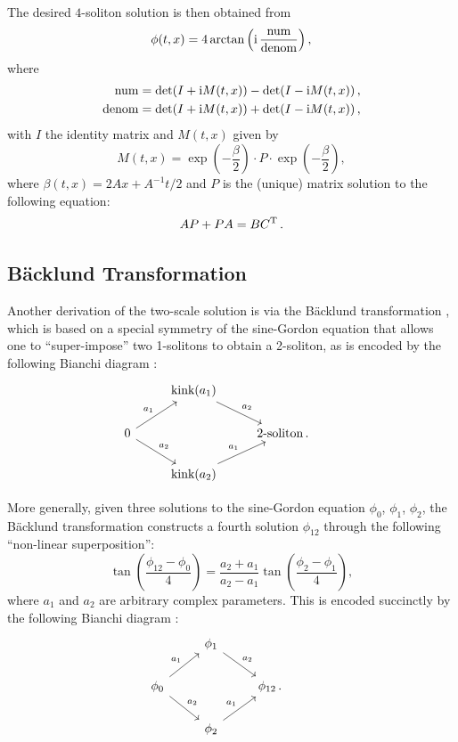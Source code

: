 \documentclass[%
reprint,
superscriptaddress,
amsmath,amssymb,
aps,
prd,
floatfix,
nofootinbib
]{revtex4-1}
\def\ii{{\rm i}}
\begin{document}
The desired $4$-soliton solution is then obtained from
\begin{equation}
  \phi(t,x) = 4\arctan \left(\ii\,\frac{{\rm num}}{{\rm denom}}\right),
\end{equation}
where
\begin{equation}
  \begin{aligned}
    {\rm num} &= \det(I + \ii M(t,x))-\det(I - \ii M(t,x))\,,\\
    {\rm denom} &= \det(I + \ii M(t,x))+\det(I - \ii M(t,x))\,,
  \end{aligned}
\end{equation}
with $I$ the identity matrix and $M(t,x)$ given by
\begin{equation}
  M(t,x) = \exp\left(-\frac{\beta}{2}\right)\cdot P \cdot \exp\left(-\frac{\beta}{2}\right),
\end{equation}
where $\beta(t,x) = 2Ax+A^{-1}t/2$ and $P$ is the (unique) matrix solution to the following equation:
\begin{equation}\label{lyapnov}
  AP + PA = B C^{\rm T}\,.
\end{equation}

\subsection{B\"acklund Transformation}
Another derivation of the two-scale solution is via the B\"acklund transformation \cite{Dodd499, hietarinta1997introduction, Cuenda20111047}, which is based on a special symmetry of the sine-Gordon equation that allows one to ``super-impose'' two 1-solitons to obtain a 2-soliton, as is encoded by the following Bianchi diagram \cite{Cuenda20111047}:
\[
\begin{tikzcd}
  & \text{kink}(a_1) \arrow{dr}{a_2} &&\\
  0\arrow{ur}{a_1}\arrow{dr}{a_2}&&\text{2-soliton\,.}&\\
 &\text{kink}(a_2)\arrow{ur}{a_1}&&
\end{tikzcd}
\]

More generally, given three solutions to the sine-Gordon equation $\phi_0$, $\phi_1$, $\phi_2$, the B\"acklund transformation constructs a fourth solution $\phi_{12}$ through the following ``non-linear superposition'':
\begin{equation}
  \tan \left(\frac{\phi_{12}-\phi_0}{4}\right) = \frac{a_2+a_1}{a_2-a_1} \tan \left(\frac{\phi_2-\phi_1}{4}\right),
\end{equation}
where $a_1$ and $a_2$ are arbitrary complex parameters. This is encoded succinctly by the following Bianchi diagram \cite{Cuenda20111047}:
\begin{equation}\label{bianchi}
\begin{tikzcd}
  & \phi_1 \arrow{dr}{a_2} &&\\
  \phi_0\arrow{ur}{a_1}\arrow{dr}{a_2}&&\phi_{12}\,.&\\
 &\phi_2\arrow{ur}{a_1}&&
\end{tikzcd}
\end{equation}
\end{document}
